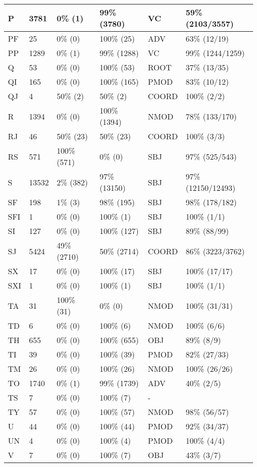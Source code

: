 \begin{figure*}
\begin{tabular}{|l|l|l|l||l|l|}
\hline
 P & 3781 & 0\% (1) & 99\% (3780) & VC & 59\% (2103/3557) \\ 
\hline
 PF & 25 & 0\% (0) & 100\% (25) & ADV & 63\% (12/19) \\ 
\hline
 PP & 1289 & 0\% (1) & 99\% (1288) & VC & 99\% (1244/1259) \\ 
\hline
 Q & 53 & 0\% (0) & 100\% (53) & ROOT & 37\% (13/35) \\ 
\hline
 QI & 165 & 0\% (0) & 100\% (165) & PMOD & 83\% (10/12) \\ 
\hline
 QJ & 4 & 50\% (2) & 50\% (2) & COORD & 100\% (2/2) \\ 
\hline
 R & 1394 & 0\% (0) & 100\% (1394) & NMOD & 78\% (133/170) \\ 
\hline
 RJ & 46 & 50\% (23) & 50\% (23) & COORD & 100\% (3/3) \\ 
\hline
 RS & 571 & 100\% (571) & 0\% (0) & SBJ & 97\% (525/543) \\ 
\hline
 S & 13532 & 2\% (382) & 97\% (13150) & SBJ & 97\% (12150/12493) \\ 
\hline
 SF & 198 & 1\% (3) & 98\% (195) & SBJ & 98\% (178/182) \\ 
\hline
 SFI & 1 & 0\% (0) & 100\% (1) & SBJ & 100\% (1/1) \\ 
\hline
 SI & 127 & 0\% (0) & 100\% (127) & SBJ & 89\% (88/99) \\ 
\hline
 SJ & 5424 & 49\% (2710) & 50\% (2714) & COORD & 86\% (3223/3762) \\ 
\hline
 SX & 17 & 0\% (0) & 100\% (17) & SBJ & 100\% (17/17) \\ 
\hline
 SXI & 1 & 0\% (0) & 100\% (1) & SBJ & 100\% (1/1) \\ 
\hline
 TA & 31 & 100\% (31) & 0\% (0) & NMOD & 100\% (31/31) \\ 
\hline
 TD & 6 & 0\% (0) & 100\% (6) & NMOD & 100\% (6/6) \\ 
\hline
 TH & 655 & 0\% (0) & 100\% (655) & OBJ & 89\% (8/9) \\ 
\hline
 TI & 39 & 0\% (0) & 100\% (39) & PMOD & 82\% (27/33) \\ 
\hline
 TM & 26 & 0\% (0) & 100\% (26) & NMOD & 100\% (26/26) \\ 
\hline
 TO & 1740 & 0\% (1) & 99\% (1739) & ADV & 40\% (2/5) \\ 
\hline
 TS & 7 & 0\% (0) & 100\% (7) & - &  \\ 
\hline
 TY & 57 & 0\% (0) & 100\% (57) & NMOD & 98\% (56/57) \\ 
\hline
 U & 44 & 0\% (0) & 100\% (44) & PMOD & 92\% (34/37) \\ 
\hline
 UN & 4 & 0\% (0) & 100\% (4) & PMOD & 100\% (4/4) \\ 
\hline
 V & 7 & 0\% (0) & 100\% (7) & OBJ & 43\% (3/7) \\ 
\hline
\end{tabular}
\end{figure*}
